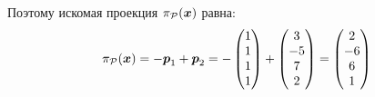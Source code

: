 \documentclass[a4paper,12pt]{article}
\begin{document}
\begin{solution}
    Поэтому искомая проекция $\pi_{\mathcal P}(\boldsymbol x)$ равна:
    \[
      \pi_{\mathcal P}(\boldsymbol x) = -\boldsymbol p_1 + \boldsymbol p_2
      = -\begin{pmatrix} 1 \\ 1 \\ 1 \\ 1 \end{pmatrix} + \begin{pmatrix} 3 \\ -5 \\ 7 \\ 2\end{pmatrix}
      = \begin{pmatrix} 2 \\ -6 \\ 6 \\ 1 \end{pmatrix}
    \]
    
    
  \end{solution}
\end{document}
